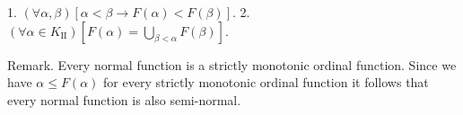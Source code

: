 1. $(\forall \alpha, \beta)[\alpha < \beta \rightarrow F(\alpha) < F(\beta)]$.
2. $(\forall \alpha \in K_{\mathrm{II}})\left[ F(\alpha) = \bigcup_{\beta < \alpha} F(\beta) \right]$.

Remark. Every normal function is a strictly monotonic ordinal function. Since we have $\alpha \leq F(\alpha)$ for every strictly monotonic ordinal function it follows that every normal function is also semi-normal.
